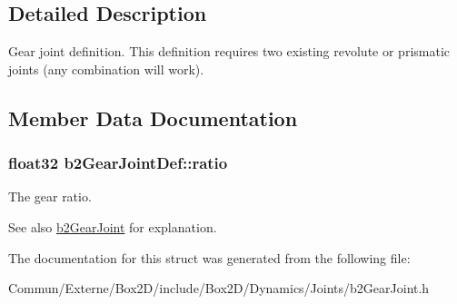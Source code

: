 \subsection{Detailed Description}
Gear joint definition. This definition requires two existing revolute or prismatic joints (any combination will work). 

\subsection{Member Data Documentation}
\subsubsection[{\texorpdfstring{ratio}{ratio}}]{\setlength{\rightskip}{0pt plus 5cm}float32 b2\+Gear\+Joint\+Def\+::ratio}\hypertarget{structb2_gear_joint_def_a57e9f4b6ce1ddc8b89b8455515f69323}{}\label{structb2_gear_joint_def_a57e9f4b6ce1ddc8b89b8455515f69323}
The gear ratio. \begin{DoxySeeAlso}{See also}
\hyperlink{classb2_gear_joint}{b2\+Gear\+Joint} for explanation. 
\end{DoxySeeAlso}


The documentation for this struct was generated from the following file\+:\begin{DoxyCompactItemize}
\item 
Commun/\+Externe/\+Box2\+D/include/\+Box2\+D/\+Dynamics/\+Joints/b2\+Gear\+Joint.\+h\end{DoxyCompactItemize}
